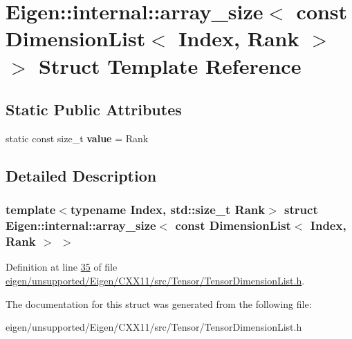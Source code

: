 \hypertarget{struct_eigen_1_1internal_1_1array__size_3_01const_01_dimension_list_3_01_index_00_01_rank_01_4_01_4}{}\section{Eigen\+:\+:internal\+:\+:array\+\_\+size$<$ const Dimension\+List$<$ Index, Rank $>$ $>$ Struct Template Reference}
\label{struct_eigen_1_1internal_1_1array__size_3_01const_01_dimension_list_3_01_index_00_01_rank_01_4_01_4}
\subsection*{Static Public Attributes}
\begin{DoxyCompactItemize}
\item 
\mbox{\label{struct_eigen_1_1internal_1_1array__size_3_01const_01_dimension_list_3_01_index_00_01_rank_01_4_01_4_a5c24b5e47843273cef43843eefbb2490}} 
static const size\+\_\+t {\bfseries value} = Rank
\end{DoxyCompactItemize}


\subsection{Detailed Description}
\subsubsection*{template$<$typename Index, std\+::size\+\_\+t Rank$>$\newline
struct Eigen\+::internal\+::array\+\_\+size$<$ const Dimension\+List$<$ Index, Rank $>$ $>$}



Definition at line \hyperlink{eigen_2unsupported_2_eigen_2_c_x_x11_2src_2_tensor_2_tensor_dimension_list_8h_source_l00035}{35} of file \hyperlink{eigen_2unsupported_2_eigen_2_c_x_x11_2src_2_tensor_2_tensor_dimension_list_8h_source}{eigen/unsupported/\+Eigen/\+C\+X\+X11/src/\+Tensor/\+Tensor\+Dimension\+List.\+h}.



The documentation for this struct was generated from the following file\+:\begin{DoxyCompactItemize}
\item 
eigen/unsupported/\+Eigen/\+C\+X\+X11/src/\+Tensor/\+Tensor\+Dimension\+List.\+h\end{DoxyCompactItemize}
